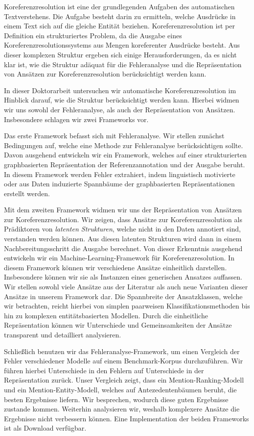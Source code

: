 \addchap*{\abstractname}

Koreferenzresolution ist eine der grundlegenden Aufgaben des automatischen Textverstehens. Die Aufgabe besteht darin zu ermitteln, welche Ausdrücke in einem Text sich auf die gleiche Entität beziehen. Koreferenzresolution ist per Definition ein strukturiertes Problem, da die Ausgabe eines Koreferenzresolutionssystems aus Mengen koreferenter Ausdrücke besteht. Aus dieser komplexen Struktur ergeben sich einige Herausforderungen, da es nicht klar ist, wie die Struktur adäquat für die Fehleranalyse und die Repräsentation von Ansätzen zur Koreferenzresolution berücksichtigt werden kann.

In dieser Doktorarbeit untersuchen wir automatische Koreferenzresolution im Hinblick darauf, wie die Struktur berücksichtigt werden kann. Hierbei widmen wir uns sowohl der Fehleranalyse, als auch der Repräsentation von Ansätzen. Insbesondere schlagen wir zwei Frameworks vor.

Das erste Framework befasst sich mit Fehleranalyse. Wir stellen zunächst Bedingungen auf, welche eine Methode zur Fehleranalyse berücksichtigen sollte. Davon ausgehend entwickeln wir ein Framework, welches auf einer strukturierten graphbasierten Repräsentation der Referenzannotation und der Ausgabe beruht. In diesem Framework werden Fehler extrahiert, indem linguistisch motivierte oder aus Daten induzierte Spannbäume der graphbasierten Repräsentationen erstellt werden.

Mit dem zweiten Framework widmen wir uns der Repräsentation von Ansätzen zur Koreferenzresolution. Wir zeigen, dass Ansätze zur Koreferenzresolution als Prädiktoren von \emph{latenten Strukturen}, welche nicht in den Daten annotiert sind, verstanden werden können. Aus diesen latenten Strukturen wird dann in einem Nachbereitungsschritt die Ausgabe berechnet. Von dieser Erkenntnis ausgehend entwickeln wir ein Machine-Learning-Framework für Koreferenzresolution. In diesem Framework können wir verschiedene Ansätze einheitlich darstellen. Insbesondere können wir sie als Instanzen eines generischen Ansatzes auffassen. Wir stellen sowohl viele Ansätze aus der Literatur als auch neue Varianten dieser Ansätze in unserem Framework dar. Die Spannbreite der Ansatzklassen, welche wir betrachten, reicht hierbei von simplen paarweisen Klassifikationsmethoden bis hin zu komplexen entitätsbasierten Modellen. Durch die einheitliche Repräsentation können wir Unterschiede und Gemeinsamkeiten der Ansätze transparent und detailliert analysieren.

Schließlich benutzen wir das Fehleranalyse-Framework, um einen Vergleich der Fehler verschiedener Modelle auf einem Benchmark-Korpus durchzuführen. Wir führen hierbei Unterschiede in den Fehlern auf Unterschiede in der Repräsentation zurück. Unser Vergleich zeigt, dass ein Mention-Ranking-Modell und ein Mention-Entity-Modell, welches auf Antezedentenbäumen beruht, die besten Ergebnisse liefern. Wir besprechen, wodurch diese guten Ergebnisse zustande kommen. Weiterhin analysieren wir, weshalb komplexere Ansätze die Ergebnisse nicht verbessern können. Eine Implementation der beiden Frameworks ist als Download verfügbar.


